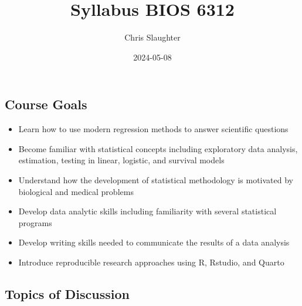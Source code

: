 \documentclass[
  letterpaper,
  DIV=11,
  numbers=noendperiod]{scrartcl}
\title{Syllabus BIOS 6312}
\author{Chris Slaughter}
\date{2024-05-08}
\providecommand{\tightlist}{%
  \setlength{\itemsep}{0pt}\setlength{\parskip}{0pt}}\usepackage{longtable,booktabs,array}
\begin{document}
\maketitle
\ifdefined\Shaded\renewenvironment{Shaded}{\begin{tcolorbox}[sharp corners, interior hidden, enhanced, frame hidden, borderline west={3pt}{0pt}{shadecolor}, boxrule=0pt, breakable]}{\end{tcolorbox}}\fi

\hypertarget{course-goals}{%
\subsection{Course Goals}\label{course-goals}}

\begin{itemize}
\tightlist
\item
  Learn how to use modern regression methods to answer scientific
  questions
\item
  Become familiar with statistical concepts including exploratory data
  analysis, estimation, testing in linear, logistic, and survival models
\item
  Understand how the development of statistical methodology is motivated
  by biological and medical problems
\item
  Develop data analytic skills including familiarity with several
  statistical programs
\item
  Develop writing skills needed to communicate the results of a data
  analysis
\item
  Introduce reproducible research approaches using R, Rstudio, and
  Quarto
\end{itemize}

\hypertarget{topics-of-discussion}{%
\subsection{Topics of Discussion}\label{topics-of-discussion}}
\end{document}
